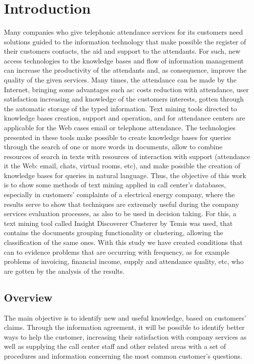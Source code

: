 \section{Introduction}
\paragraph{}Many companies who give telephonic attendance services for its customers need solutions guided to the information technology that make possible the register of their customers contacts, the aid and support to the attendants. For such, new access technologies to the knowledge bases and flow of information management can increase the productivity of the attendants and, as consequence, improve the quality of the given services. Many times, the attendance can be made by the Internet, bringing some advantages such as: costs reduction with attendance, user satisfaction increasing and knowledge of the customers interests, gotten through the automatic storage of the typed information. Text mining tools directed to knowledge bases creation, support and operation, and for attendance centers are applicable for the Web cases email or telephone attendance. The technologies presented in these tools make possible to create knowledge bases for queries through the search of one or more words in documents, allow to combine resources of search in texts with resources of interaction with support (attendance it the Web: email, chats, virtual rooms, etc), and make possible the creation of knowledge bases for queries in natural language. Thus, the objective of this work is to show some methods of text mining applied in call center’s databases, especially in customers’ complaints of a electrical energy company, where the results serve to show that techniques are extremely useful during the company services evaluation processes, as also to be used in decision taking. For this, a text mining tool called Insight Discoverer Clusterer by Temis was used, that contains the documents grouping functionality or clustering, allowing the classification of the same ones. With this study we have created conditions that can to evidence problems that are occurring with frequency, as for example problems of invoicing, financial income, supply and attendance quality, etc, who are gotten by the analysis of the results.

\subsection{\textbf{Overview}}
The main objective is to identify new and useful knowledge, based on customers’ claims. Through the information agreement, it will be possible to identify better ways to help the customer, increasing their satisfaction with company services as well as supplying the call center staff and other related areas with a set of procedures and information concerning the most common customer’s questions.
